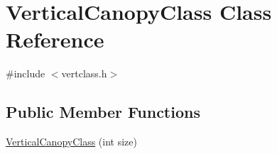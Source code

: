 \hypertarget{class_vertical_canopy_class}{}\section{Vertical\+Canopy\+Class Class Reference}
\label{class_vertical_canopy_class}


{\ttfamily \#include $<$vertclass.\+h$>$}

\subsection*{Public Member Functions}
\begin{DoxyCompactItemize}
\item 
\hyperlink{class_vertical_canopy_class_a0bf2b435d74797e6314b5e9580baf2d5}{Vertical\+Canopy\+Class} (int size)
\end{DoxyCompactItemize}
